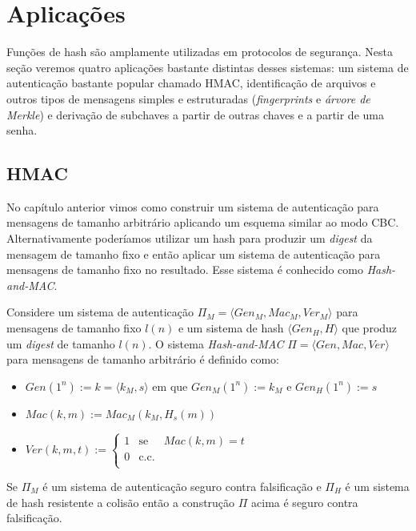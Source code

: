 \section{Aplicações}
\label{sec:aplicacoes}

Funções de hash são amplamente utilizadas em protocolos de segurança.
Nesta seção veremos quatro aplicações bastante distintas desses sistemas: um sistema de autenticação bastante popular chamado HMAC, identificação de arquivos e outros tipos de mensagens simples e estruturadas  ({\em fingerprints} e {\em árvore de Merkle}) e derivação de subchaves a partir de outras chaves e a partir de uma senha.

\subsection{HMAC}
\label{sec:hmac}

No capítulo anterior vimos como construir um sistema de autenticação para mensagens de tamanho arbitrário aplicando um esquema similar ao modo CBC.
Alternativamente poderíamos utilizar um hash para produzir um {\em digest} da mensagem de tamanho fixo e então aplicar um sistema de autenticação para mensagens de tamanho fixo no resultado.
Esse sistema é conhecido como {\em Hash-and-MAC}.

Considere um sistema de autenticação $\Pi_M = \langle Gen_M, Mac_M, Ver_M \rangle$ para mensagens de tamanho fixo $l(n)$ e um sistema de hash $\langle Gen_H, H \rangle$ que produz um {\em digest} de tamanho $l(n)$.
O sistema {\em Hash-and-MAC} $\Pi = \langle Gen, Mac, Ver \rangle$ para mensagens de tamanho arbitrário é definido como:
\begin{itemize}
\item $Gen(1^n) := k = \langle k_M, s \rangle$ em que $Gen_M(1^n) := k_M$ e $Gen_H(1^n) := s$
\item $Mac(k, m) := Mac_M(k_M, H_s(m))$
\item $Ver(k, m, t) := \left\{
    \begin{array}{lcl}
      1 & \textrm{se} & Mac(k,m) = t\\
      0 & \textrm{c.c.} &\\
    \end{array}
    \right.$ 
\end{itemize}


\begin{theorem}
  Se $\Pi_M$ é um sistema de autenticação seguro contra falsificação e $\Pi_H$ é um sistema de hash resistente a colisão então a construção $\Pi$ acima é seguro contra falsificação. 
\end{theorem}

